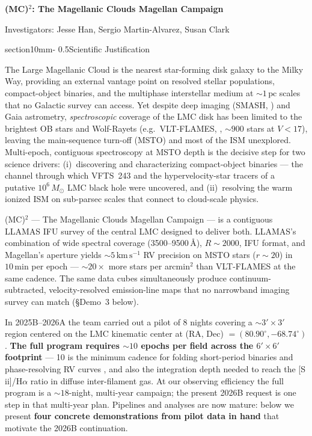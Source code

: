 \documentclass[12pt]{article}
\makeatletter
\renewcommand{\section}{\@startsection%
{section}{1}{0mm}{-\baselineskip}%
{0.5\baselineskip}{\normalfont\large\bfseries}}%
\newcommand{\ms}{\ensuremath{M_{\odot}}}
\newcommand{\kms}{\ensuremath{\mathrm{km}\,\mathrm{s}^{-1}}}
\makeatother
\begin{document}
 

\begin{center}
\textbf{\large \textsc{\textsf{(MC)$^2$}}: The Magellanic Clouds Magellan Campaign}

Investigators: Jesse Han, Sergio Martin-Alvarez, Susan Clark
\end{center}

\section{Scientific Justification}

The Large Magellanic Cloud is the nearest star-forming disk galaxy to the Milky Way, providing an external vantage point on resolved stellar populations, compact-object binaries, and the multiphase interstellar medium at $\sim1\,\mathrm{pc}$ scales that no Galactic survey can access. Yet despite deep imaging (SMASH, \citealt{nidever2017}) and Gaia astrometry, \emph{spectroscopic} coverage of the LMC disk has been limited to the brightest OB stars and Wolf-Rayets (e.g.\ VLT-FLAMES, \citealt{vlt_flames}, $\sim900$ stars at $V<17$), leaving the main-sequence turn-off (MSTO) and most of the ISM unexplored. Multi-epoch, contiguous spectroscopy at MSTO depth is the decisive step for two science drivers: (i)~discovering and characterizing compact-object binaries --- the channel through which VFTS~243 \citep{shenar2022} and the hypervelocity-star tracers of a putative $10^6\,\ms$ LMC black hole \citep{han2025} were uncovered, and (ii)~resolving the warm ionized ISM on sub-parsec scales that connect to cloud-scale physics.

\noindent\textsc{\textsf{(MC)$^2$}} --- The Magellanic Clouds Magellan Campaign --- is a contiguous LLAMAS IFU survey of the central LMC designed to deliver both. LLAMAS's combination of wide spectral coverage (3500--9500\,\AA), $R\sim2000$, IFU format, and Magellan's aperture yields $\sim5\,\kms$ RV precision on MSTO stars ($r\sim20$) in $10\,\mathrm{min}$ per epoch --- $\sim20\times$ more stars per arcmin$^2$ than VLT-FLAMES at the same cadence. The same data cubes simultaneously produce continuum-subtracted, velocity-resolved emission-line maps that no narrowband imaging survey can match (\S Demo~3 below).

\noindent In 2025B--2026A the team carried out a pilot of 8 nights covering a $\sim3'\times3'$ region centered on the LMC kinematic center at (RA, Dec) $=(80.90^\circ, -68.74^\circ)$ \citep{wan2020}. \textbf{The full program requires $\sim10$ epochs per field across the $6'\times6'$ footprint} --- 10 is the minimum cadence for folding short-period binaries and phase-resolving RV curves \citep[cf.][]{vlt_flames}, and also the integration depth needed to reach the [S\,{\sc ii}]/H$\alpha$ ratio in diffuse inter-filament gas. At our observing efficiency the full program is a $\sim 18$-night, multi-year campaign; the present 2026B request is one step in that multi-year plan. Pipelines and analyses are now mature: below we present \textbf{four concrete demonstrations from pilot data in hand} that motivate the 2026B continuation.
\end{document}
